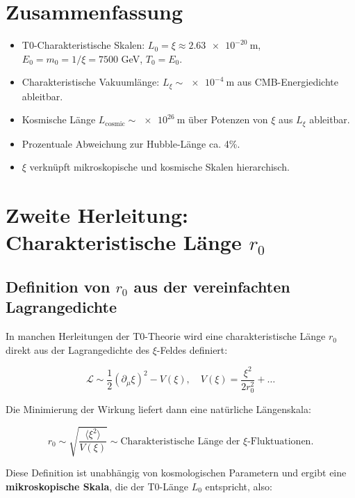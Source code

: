 \documentclass[12pt,a4paper]{article}
\begin{document}
	\section{Zusammenfassung}
	
	\begin{itemize}
		\item T0-Charakteristische Skalen: $L_0 = \xi \approx \SI{2.63e-20}{\meter}$, $E_0 = m_0 = 1/\xi = 7500$ GeV, $T_0 = E_0$.
		\item Charakteristische Vakuumlänge: $L_\xi \sim \SI{e-4}{\meter}$ aus CMB-Energiedichte ableitbar.
		\item Kosmische Länge $L_{\mathrm{cosmic}} \sim \SI{e26}{\meter}$ über Potenzen von $\xi$ aus $L_\xi$ ableitbar.
		\item Prozentuale Abweichung zur Hubble-Länge ca. 4\%.
		\item $\xi$ verknüpft mikroskopische und kosmische Skalen hierarchisch.
	\end{itemize}
	
	\section{Zweite Herleitung: Charakteristische Länge $r_0$}
	
	\subsection{Definition von $r_0$ aus der vereinfachten Lagrangedichte}
	
	In manchen Herleitungen der T0-Theorie wird eine charakteristische Länge $r_0$ direkt aus der Lagrangedichte des $\xi$-Feldes definiert:
	
	\begin{equation}
		\mathcal{L} \sim \frac{1}{2} (\partial_\mu \xi)^2 - V(\xi), \quad V(\xi) = \frac{\xi^2}{2 r_0^2} + \dots
	\end{equation}
	
	Die Minimierung der Wirkung liefert dann eine natürliche Längenskala:
	
	\begin{equation}
		r_0 \sim \sqrt{\frac{\langle \xi^2 \rangle}{V(\xi)}} \sim \text{Charakteristische Länge der $\xi$-Fluktuationen}.
	\end{equation}
	
	Diese Definition ist unabhängig von kosmologischen Parametern und ergibt eine \textbf{mikroskopische Skala}, die der T0-Länge $L_0$ entspricht, also:
	
\end{document}
